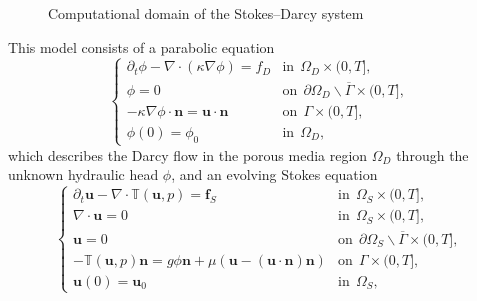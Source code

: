 \documentclass[a4paper, oneside]{book}
\def\u{{\mathbf{u}}}
\def\bfu{{\mathbf{u}}}
\def\R{{\mathbb R}}
\def\bfn{{\mathbf{n}}}
\def\T{\mathbb{T}}
\begin{document}
\begin{figure}[t]
\begin{center}
\end{center}
\caption{Computational domain of the Stokes--Darcy system}
\label{NS_Darcy_domain}
\end{figure}
This model consists of a parabolic equation
\begin{equation}\label{DS-1}
\begin{cases}
\partial_t \phi -\nabla\cdot(\kappa\nabla\phi)  = f_D
&\mbox{in}~~\Omega_D\times(0,T], \\
\phi = 0 &\mbox{on}~~\partial\Omega_D
\backslash\overline\Gamma\times(0,T] ,\\
-\kappa\nabla\phi\cdot \bfn = \u\cdot \bfn   & \mbox{on}~~\Gamma\times(0,T] ,\\
\phi(0)= \phi_0 & \mbox{in}~~\Omega_D,
\end{cases}
\end{equation}
which describes the Darcy flow in the porous media region $\Omega_D$ through the unknown hydraulic head $\phi$,
and an evolving Stokes equation
\begin{equation}\label{DS-2}
\begin{cases}
\partial_t \u - \nabla\cdot \T(\u, p )
= \mathbf{f}_S &\mbox{in}~~\Omega_S\times(0,T] , \\
\nabla\cdot\u=0 &\mbox{in}~~\Omega_S\times(0,T] , \\
\u  = 0 &\mbox{on}~~\partial\Omega_S
\backslash\overline\Gamma\times(0,T] ,\\
-\T(\u,p)\bfn = g \phi \bfn +\mu(\bfu-(\bfu\cdot\bfn)\bfn)
& \mbox{on}~~\Gamma\times(0,T] , \\
\u(0)=\u_0 & \mbox{in}~~\Omega_S,
\end{cases}
\end{equation}
\end{document}
